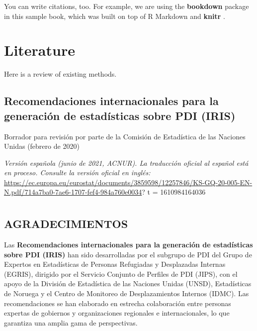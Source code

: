 \documentclass[
]{book}
\begin{document}
You can write citations, too. For example, we are using the \textbf{bookdown} package \citep{R-bookdown} in this sample book, which was built on top of R Markdown and \textbf{knitr} \citep{xie2015}.

\hypertarget{literature}{%
\chapter{Literature}\label{literature}}

Here is a review of existing methods.

\hypertarget{recomendaciones-internacionales-para-la-generaciuxf3n-de-estaduxedsticas-sobre-pdi-iris}{%
\section{\texorpdfstring{\textbf{Recomendaciones internacionales para la generación de estadísticas sobre PDI (IRIS)}}{Recomendaciones internacionales para la generación de estadísticas sobre PDI (IRIS)}}\label{recomendaciones-internacionales-para-la-generaciuxf3n-de-estaduxedsticas-sobre-pdi-iris}}

Borrador para revisión por parte de la Comisión de Estadística de las Naciones Unidas
(febrero de 2020)

\emph{Versión española (junio de 2021, ACNUR). La traducción oficial al español está en proceso. Consulte la versión oficial en inglés:} \url{https://ec.europa.eu/eurostat/documents/3859598/12257846/KS-GQ-20-005-EN-N.pdf/714a7ba0-7ae6-1707-fef4-984a760e0034}? t = 1610984164036

\hypertarget{section}{%
\chapter{}\label{section}}

\hypertarget{section-1}{%
\chapter{}\label{section-1}}

\hypertarget{agradecimientos}{%
\section{AGRADECIMIENTOS}\label{agradecimientos}}

Las \textbf{Recomendaciones internacionales para la generación de estadísticas sobre PDI (IRIS)} han sido desarrolladas por el subgrupo de PDI del Grupo de Expertos en Estadísticas de Personas Refugiadas y Desplazadas Internas (EGRIS), dirigido por el Servicio Conjunto de Perfiles de PDI (JIPS), con el apoyo de la División de Estadística de las Naciones Unidas (UNSD), Estadísticas de Noruega y el Centro de Monitoreo de Desplazamientos Internos (IDMC). Las recomendaciones se han elaborado en estrecha colaboración entre personas expertas de gobiernos y organizaciones regionales e internacionales, lo que garantiza una amplia gama de perspectivas.
\end{document}
